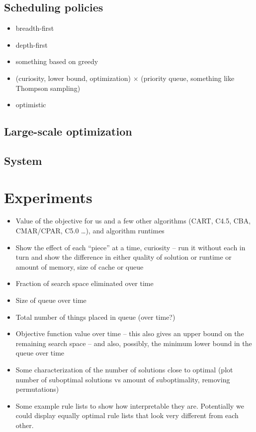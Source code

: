 \subsection{Scheduling policies}

\begin{itemize}
\item breadth-first
\item depth-first
\item something based on greedy
\item (curiosity, lower bound, optimization) $\times$ (priority queue, something like Thompson sampling)
\item optimistic
\end{itemize}

\subsection{Large-scale optimization}

\subsection{System}

\section{Experiments}

\begin{itemize}

\item Value of the objective for us and a few other algorithms (CART, C4.5, CBA, CMAR/CPAR, C5.0 \dots), and algorithm runtimes 

\item Show the effect of each ``piece'' at a time, \eg curiosity -- run it without each in turn and show the difference in either quality of solution or runtime or amount of memory, size of cache or queue

\item Fraction of search space eliminated over time

\item Size of queue over time

\item Total number of things placed in queue (over time?)

\item Objective function value over time -- this also gives an upper bound on the remaining search space -- and also, possibly, the minimum lower bound in the queue over time

\item Some characterization of the number of solutions close to optimal (plot number of suboptimal solutions vs amount of suboptimality, removing permutations)

\item Some example rule lists to show how interpretable they are. Potentially we could display equally optimal rule lists that look very different from each other. 

\end{itemize}

